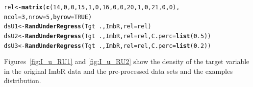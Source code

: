 \documentclass[10pt,a4paper]{article}\usepackage[]{graphicx}\usepackage[]{color}
\makeatletter
\newcommand{\hlnum}[1]{\textcolor[rgb]{0.686,0.059,0.569}{#1}}%
\newcommand{\hlopt}[1]{\textcolor[rgb]{0,0,0}{#1}}%
\newcommand{\hlstd}[1]{\textcolor[rgb]{0.345,0.345,0.345}{#1}}%
\newcommand{\hlkwb}[1]{\textcolor[rgb]{0.69,0.353,0.396}{#1}}%
\newcommand{\hlkwc}[1]{\textcolor[rgb]{0.333,0.667,0.333}{#1}}%
\newcommand{\hlkwd}[1]{\textcolor[rgb]{0.737,0.353,0.396}{\textbf{#1}}}%
\newenvironment{kframe}{%
 \def\at@end@of@kframe{}%
 \ifinner\ifhmode%
  \def\at@end@of@kframe{\end{minipage}}%
  \begin{minipage}{\columnwidth}%
 \fi\fi%
 \def\FrameCommand##1{\hskip\@totalleftmargin \hskip-\fboxsep
 \colorbox{shadecolor}{##1}\hskip-\fboxsep
     \hskip-\linewidth \hskip-\@totalleftmargin \hskip\columnwidth}%
 \MakeFramed {\advance\hsize-\width
   \@totalleftmargin\z@ \linewidth\hsize
   \@setminipage}}%
 {\par\unskip\endMakeFramed%
 \at@end@of@kframe}
\newenvironment{knitrout}{}{} %
\makeatother
\begin{document}
\begin{knitrout}\footnotesize
{}\color{fgcolor}\begin{kframe}
\begin{alltt}
\hlstd{rel} \hlkwb{<-} \hlkwd{matrix}\hlstd{(}\hlkwd{c}\hlstd{(}\hlnum{14}\hlstd{,} \hlnum{0}\hlstd{,} \hlnum{0}\hlstd{,} \hlnum{15}\hlstd{,} \hlnum{1}\hlstd{,} \hlnum{0}\hlstd{,} \hlnum{16}\hlstd{,} \hlnum{0}\hlstd{,} \hlnum{0}\hlstd{,} \hlnum{20}\hlstd{,} \hlnum{1}\hlstd{,} \hlnum{0}\hlstd{,} \hlnum{21}\hlstd{,} \hlnum{0}\hlstd{,} \hlnum{0}\hlstd{),}
              \hlkwc{ncol}\hlstd{=}\hlnum{3}\hlstd{,} \hlkwc{nrow}\hlstd{=}\hlnum{5}\hlstd{,} \hlkwc{byrow}\hlstd{=}\hlnum{TRUE}\hlstd{)}
\hlstd{dsU1} \hlkwb{<-} \hlkwd{RandUnderRegress}\hlstd{(Tgt}\hlopt{~}\hlstd{., ImbR,} \hlkwc{rel}\hlstd{=rel)}
\hlstd{dsU2} \hlkwb{<-} \hlkwd{RandUnderRegress}\hlstd{(Tgt}\hlopt{~}\hlstd{., ImbR,} \hlkwc{rel}\hlstd{=rel,} \hlkwc{C.perc}\hlstd{=}\hlkwd{list}\hlstd{(}\hlnum{0.5}\hlstd{))}
\hlstd{dsU3} \hlkwb{<-} \hlkwd{RandUnderRegress}\hlstd{(Tgt}\hlopt{~}\hlstd{., ImbR,} \hlkwc{rel}\hlstd{=rel,} \hlkwc{C.perc}\hlstd{=}\hlkwd{list}\hlstd{(}\hlnum{0.2}\hlstd{))}
\end{alltt}
\end{kframe}
\end{knitrout}


Figures~\ref{fig:I_u_RU1} and \ref{fig:I_u_RU2} show the density of the target variable in the original ImbR data and the pre-processed data sets and the examples distribution.
\end{document}
